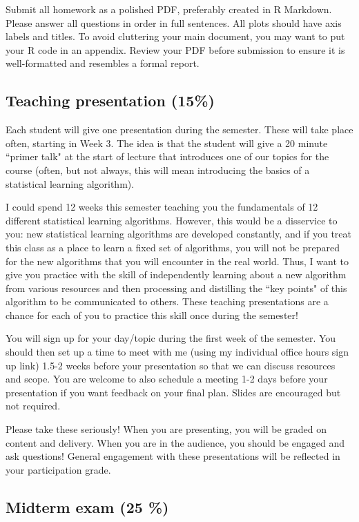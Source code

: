 \documentclass[11pt]{article}
\begin{document}
Submit all homework as a polished PDF, preferably created in R Markdown. Please answer all questions in order in full sentences. All plots should have axis labels and titles. To avoid cluttering your main document, you may want to put your R code in an appendix. Review your PDF before submission to ensure it is well-formatted and resembles a formal report. 
  
\subsection{Teaching presentation (15\%)}

Each student will give one presentation during the semester. These will take place often, starting in Week 3. The idea is that the student will give a 20 minute ``primer talk" at the start of lecture that introduces one of our topics for the course (often, but not always, this will mean introducing the basics of a statistical learning algorithm). 

I could spend 12 weeks this semester teaching you the fundamentals of 12 different statistical learning algorithms. However, this would be a disservice to you: new statistical learning algorithms are developed constantly, and if you treat this class as a place to learn a fixed set of algorithms, you will not be prepared for the new algorithms that you will encounter in the real world. Thus, I want to give you practice with the skill of independently learning about a new algorithm from various resources and then processing and distilling the ``key points" of this algorithm to be communicated to others. These teaching presentations are a chance for each of you to practice this skill once during the semester! 

You will sign up for your day/topic during the first week of the semester. You should then set up a time to meet with me (using my individual office hours sign up link) 1.5-2 weeks before your presentation so that we can discuss resources and scope. You are welcome to also schedule a meeting 1-2 days before your presentation if you want feedback on your final plan. Slides are encouraged but not required. 

Please take these seriously! When you are presenting, you will be graded on content and delivery. When you are in the audience, you should be engaged and ask questions! General engagement with these presentations will be reflected in your participation grade.


\subsection{Midterm exam (25 \%)}
\end{document}
